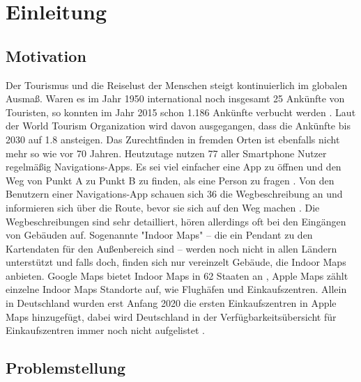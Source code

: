 \chapter{Einleitung}

\section{Motivation}
Der Tourismus und die Reiselust der Menschen steigt kontinuierlich im globalen Ausmaß. Waren es im Jahr 1950 international noch insgesamt \SI{25}{\mio} Ankünfte von Touristen, so konnten im Jahr 2015 schon \SI{1.186}{\mrd} Ankünfte verbucht werden \parencite{GLA2017}. Laut der World Tourism Organization wird davon ausgegangen, dass die Ankünfte bis 2030 auf \SI{1.8}{\mrd} ansteigen. Das Zurechtfinden in fremden Orten ist ebenfalls nicht mehr so wie vor 70 Jahren. Heutzutage nutzen \SI{77}{\prc} aller Smartphone Nutzer regelmäßig Navigations-Apps. Es sei viel einfacher eine App zu öffnen und den Weg von Punkt A zu Punkt B zu finden, als eine Person zu fragen \parencite{PAN2018}.%
%
Von den Benutzern einer Navigations-App schauen sich \SI{36}{\prc} die Wegbeschreibung an und informieren sich über die Route, bevor sie sich auf den Weg machen \parencite{PAN2018}. Die Wegbeschreibungen sind sehr detailliert, hören allerdings oft bei den Eingängen von Gebäuden auf. Sogenannte "Indoor Maps" – die ein Pendant zu den Kartendaten für den Außenbereich sind – werden noch nicht in allen Ländern unterstützt und falls doch, finden sich nur vereinzelt Gebäude, die Indoor Maps anbieten. Google Maps bietet Indoor Maps in 62 Staaten an \parencite{GOO2020}, Apple Maps zählt einzelne Indoor Maps Standorte auf, wie Flughäfen und Einkaufszentren. Allein in Deutschland wurden erst Anfang 2020 die ersten Einkaufszentren in Apple Maps hinzugefügt, dabei wird Deutschland in der Verfügbarkeitsübersicht für Einkaufszentren immer noch nicht aufgelistet \parencite{OES2020}.%
%
\section{Problemstellung}


